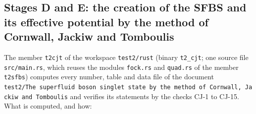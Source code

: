 \documentclass[
  10pt,
]{article}
\begin{document}
\hypertarget{stages-d-and-e-the-creation-of-the-sfbs-and-its-effective-potential-by-the-method-of-cornwall-jackiw-and-tomboulis}{%
\subsection{Stages D and E: the creation of the SFBS and its effective
potential by the method of Cornwall, Jackiw and
Tomboulis}\label{stages-d-and-e-the-creation-of-the-sfbs-and-its-effective-potential-by-the-method-of-cornwall-jackiw-and-tomboulis}}

The member \texttt{t2cjt} of the workspace \texttt{test2/rust} (binary
\texttt{t2\_cjt}; one source file \texttt{src/main.rs}, which reuses the
modules \texttt{fock.rs} and \texttt{quad.rs} of the member
\texttt{t2sfbs}) computes every number, table and data file of the
document
\texttt{test2/The\ superfluid\ boson\ singlet\ state\ by\ the\ method\ of\ Cornwall,\ Jackiw\ and\ Tomboulis}
and verifies its statements by the checks CJ-1 to CJ-15. What is
computed, and how:
\end{document}
